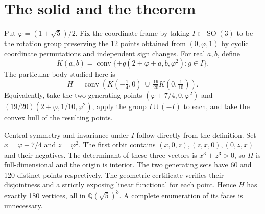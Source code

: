 \documentclass[11pt,a4paper]{article}
\newcommand{\conv}{\operatorname{conv}}
\newcommand{\SO}{\operatorname{SO}}
\newcommand{\Q}{\mathbb Q}
\newcommand{\HH}{H}
\begin{document}
\section{The solid and the theorem}\label{sec:solid}
Put $\varphi=(1+\sqrt5)/2$. Fix the coordinate frame by taking $I\subset\SO(3)$
to be the rotation group preserving the 12 points obtained from
$(0,\varphi,1)$ by cyclic coordinate permutations and independent sign changes.
For real $a,b$, define
\[
 K(a,b)=\conv\{\pm g(2+\varphi+a,b,\varphi^2):g\in I\}.
\]
The particular body studied here is
\begin{equation}\label{eq:body}
 \HH=\conv\left(K(-\tfrac14,0)\ \cup\ \tfrac{19}{20}K(0,\tfrac1{10})\right).
\end{equation}
Equivalently, take the two generating points
$(\varphi+7/4,0,\varphi^2)$ and
$(19/20)(2+\varphi,1/10,\varphi^2)$, apply the group $I\cup(-I)$ to each,
and take the convex hull of the resulting points.

Central symmetry and invariance under $I$ follow directly from the definition.
Set $x=\varphi+7/4$ and $z=\varphi^2$. The first orbit contains
$(x,0,z),(z,x,0),(0,z,x)$ and their negatives. The determinant of these three
vectors is $x^3+z^3>0$, so $\HH$ is full-dimensional and the origin is interior.
The two generating sets have 60 and 120 distinct points respectively. The
geometric certificate verifies their disjointness and a strictly exposing
linear functional for each point. Hence $\HH$ has exactly 180 vertices, all
in $\Q(\sqrt5)^3$. A complete enumeration of its faces is unnecessary.
\end{document}
